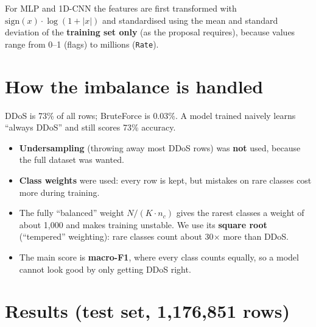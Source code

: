 \documentclass[11pt]{article}
\begin{document}
For MLP and 1D-CNN the features are first transformed with $\mathrm{sign}(x)\cdot\log(1+|x|)$ and standardised using the mean and standard deviation
of the \textbf{training set only} (as the proposal requires), because values range from 0--1 (flags) to millions (\texttt{Rate}).

\section{How the imbalance is handled}
DDoS is 73\% of all rows; BruteForce is 0.03\%. A model trained naively learns ``always DDoS'' and still scores 73\% accuracy.
\begin{itemize}
\item \textbf{Undersampling} (throwing away most DDoS rows) was \textbf{not} used, because the full dataset was wanted.
\item \textbf{Class weights} were used: every row is kept, but mistakes on rare classes cost more during training.
\item The fully ``balanced'' weight $N/(K\cdot n_c)$ gives the rarest classes a weight of about 1,000 and makes training unstable.
We use its \textbf{square root} (``tempered'' weighting): rare classes count about 30$\times$ more than DDoS.
\item The main score is \textbf{macro-F1}, where every class counts equally, so a model cannot look good by only getting DDoS right.
\end{itemize}

\newpage
\section{Results (test set, 1,176,851 rows)}
\end{document}
